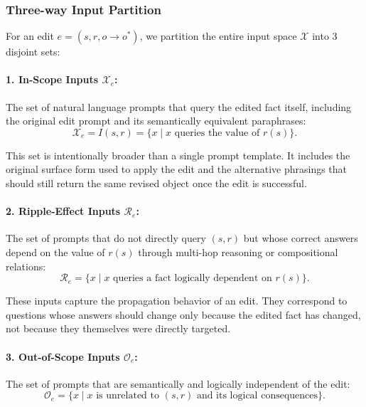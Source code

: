 \subsubsection{Three-way Input Partition}

For an edit $e = (s, r, o \rightarrow o^*)$, we partition the entire input space $\mathcal{X}$ into 3 disjoint sets:

\paragraph{1. In-Scope Inputs $\mathcal{X}_e$:} The set of natural language prompts that query the edited fact itself, including the original edit prompt and its semantically equivalent paraphrases:
\begin{equation}
\mathcal{X}_e = I(s, r) = \{x \mid x \text{ queries the value of } r(s)\}.
\end{equation}

This set is intentionally broader than a single prompt template. It includes the original surface form used to apply the edit and the alternative phrasings that should still return the same revised object once the edit is successful.

\paragraph{2. Ripple-Effect Inputs $\mathcal{R}_e$:} The set of prompts that do not directly query $(s,r)$ but whose correct answers depend on the value of $r(s)$ through multi-hop reasoning or compositional relations:
\begin{equation}
\mathcal{R}_e = \{x \mid x \text{ queries a fact logically dependent on } r(s)\}.
\end{equation}

These inputs capture the propagation behavior of an edit. They correspond to questions whose answers should change only because the edited fact has changed, not because they themselves were directly targeted.

\paragraph{3. Out-of-Scope Inputs $\mathcal{O}_e$:} The set of prompts that are semantically and logically independent of the edit:
\begin{equation}
\mathcal{O}_e = \{x \mid x \text{ is unrelated to } (s,r) \text{ and its logical consequences}\}.
\end{equation}

